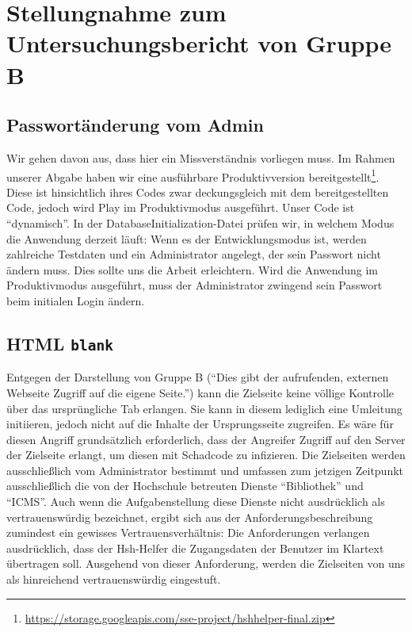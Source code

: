 \documentclass[12pt,DIV14,BCOR10mm,a4paper,parskip=half-,headsepline,headinclude,english,ngerman,bibliography=totocnumbered]{scrreprt}
\begin{document}
\vspace*{-3cm}

\tableofcontents  %

\chapter{Stellungnahme zum Untersuchungsbericht von Gruppe B}

\section{Passwortänderung vom Admin}
Wir gehen davon aus, dass hier ein Missverständnis vorliegen muss. Im Rahmen unserer Abgabe haben wir eine ausführbare Produktivversion bereitgestellt\footnote{\url{https://storage.googleapis.com/sse-project/hshhelper-final.zip}}. Diese ist hinsichtlich ihres Codes zwar deckungsgleich mit dem bereitgestellten Code, jedoch wird Play im Produktivmodus ausgeführt. Unser Code ist \enquote{dynamisch}. In der DatabaseInitialization-Datei prüfen wir, in welchem Modus die Anwendung derzeit läuft: Wenn es der Entwicklungsmodus ist, werden zahlreiche Testdaten und ein Administrator angelegt, der sein Passwort nicht ändern muss. Dies sollte uns die Arbeit erleichtern. Wird die Anwendung im Produktivmodus ausgeführt, muss der Administrator zwingend sein Passwort beim initialen Login ändern.

\section{HTML \texttt{blank}}

Entgegen der Darstellung von Gruppe B (\enquote{Dies gibt der aufrufenden, externen Webseite Zugriff auf die eigene Seite.}) kann die Zielseite keine völlige Kontrolle über das ursprüngliche Tab erlangen.
Sie kann in diesem lediglich eine Umleitung initiieren, jedoch nicht auf die Inhalte der Ursprungsseite zugreifen. Es wäre für diesen Angriff grundsätzlich erforderlich, dass der Angreifer Zugriff auf den Server der Zielseite erlangt, um diesen mit Schadcode zu infizieren. Die Zielseiten werden ausschließlich vom Administrator bestimmt und umfassen zum jetzigen Zeitpunkt ausschließlich die von der Hochschule betreuten Dienste \enquote{Bibliothek} und \enquote{ICMS}. Auch wenn die Aufgabenstellung diese Dienste nicht ausdrücklich als vertrauenswürdig bezeichnet, ergibt sich aus der Anforderungsbeschreibung zumindest ein gewisses Vertrauensverhältnis: Die Anforderungen verlangen ausdrücklich, dass der Hsh-Helfer die Zugangsdaten der Benutzer im Klartext übertragen soll. Ausgehend von dieser Anforderung, werden die Zielseiten von uns als hinreichend vertrauenswürdig eingestuft.
\end{document}
